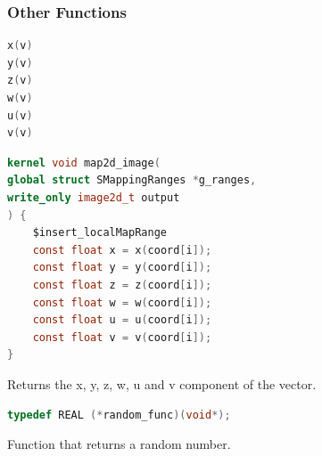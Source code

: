 \subsubsection{Other Functions}

\begin{lstlisting}[caption={Definition of components functions},label={lst:components_definition},language=OpenCL]
x(v)
y(v)
z(v)
w(v)
u(v)
v(v)
\end{lstlisting}

\begin{lstlisting}[caption={Example for components functions},label={lst:components_example},language=OpenCL]
kernel void map2d_image(
global struct SMappingRanges *g_ranges,
write_only image2d_t output
) {
    $insert_localMapRange
    const float x = x(coord[i]);
    const float y = y(coord[i]);
    const float z = z(coord[i]);
    const float w = w(coord[i]);
    const float u = u(coord[i]);
    const float v = v(coord[i]);
}
\end{lstlisting}

Returns the x, y, z, w, u and v component of the vector.

\begin{lstlisting}[caption={Definition of random function type},label={lst:random_type_definition},language=OpenCL]
typedef REAL (*random_func)(void*);
\end{lstlisting}

Function that returns a random number.
